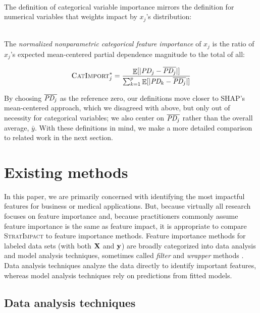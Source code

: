 \documentclass[11pt]{article}
\DeclareMathOperator{\Ex}{\mathbb{E}}
\newcommand{\CImpo}{\fontfamily{cmr}\textsc{CatImport}}
\newcommand{\simp}{\fontfamily{cmr}\textsc{\small StratImpact}}
\begin{document}
~\\

\noindent The definition of categorical variable importance mirrors the definition for numerical variables that weights impact by $x_j$'s distribution:

~\\

 The {\em normalized nonparametric categorical feature importance} of $x_j$ is the ratio of $x_j$'s expected mean-centered partial dependence magnitude to the total of all:

\begin{equation}\label{eq:Epd2b}
\CImpo_j^{*} = \frac{\Ex[|\text{\it PD}_j - \overline{\text{\it PD}_j}|]}{\sum_{k=1}^p \Ex[|\text{\it PD}_k - \overline{\text{\it PD}_j}|]}
\end{equation}

By choosing $\overline{\text{\it PD}_j}$ as the reference zero, our definitions move closer to SHAP's mean-centered approach, which we disagreed with above, but only out of necessity for categorical variables; we also center on $\overline{\text{\it PD}_j}$ rather than the overall average, $\bar{y}$. With these definitions in mind, we make a more detailed comparison to related work in the next section.

\section{Existing methods}\label{sec:existing}

In this paper, we are primarily concerned with identifying the most impactful features for business or medical applications. But, because virtually all research focuses on feature importance and, because practitioners commonly assume feature importance is the same as feature impact, it is appropriate to compare \simp{} to  feature importance methods. Feature importance methods for labeled data sets (with both $\bf X$ and $\bf y$) are broadly categorized into data analysis and model analysis techniques, sometimes called {\em filter} and {\em wrapper} methods \citep{tsanas}. Data analysis techniques analyze the data directly to identify important features, whereas model analysis techniques rely on predictions from fitted models.

\subsection{Data analysis techniques}
\end{document}
